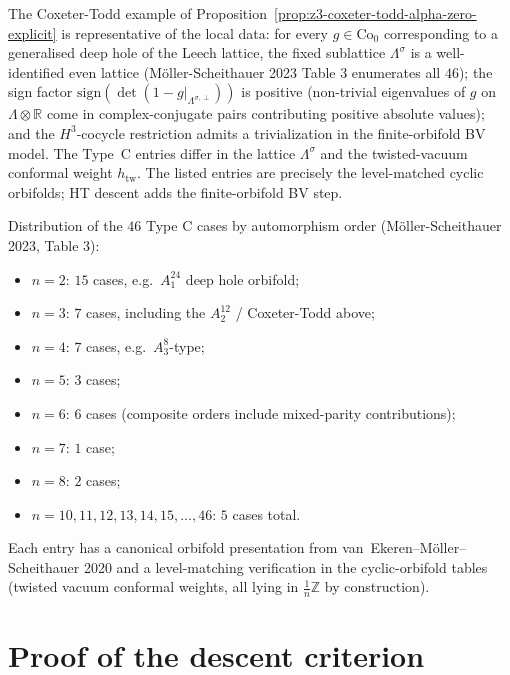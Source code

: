 \begin{remark}
\label{rem:schellekens-typeC-universal-mechanism}
The Coxeter-Todd example of
Proposition~\ref{prop:z3-coxeter-todd-alpha-zero-explicit} is
representative of the local data: for every
$g \in \mathrm{Co}_0$ corresponding to a
generalised deep hole of the Leech lattice, the fixed sublattice
$\Lambda^\sigma$ is a well-identified even lattice (M\"oller-Scheithauer
2023 Table 3 enumerates all $46$); the sign factor
$\mathrm{sign}(\det(1 - g|_{\Lambda^{\sigma,\perp}}))$ is positive
(non-trivial eigenvalues of $g$ on $\Lambda \otimes \mathbb{R}$
come in complex-conjugate pairs contributing positive absolute
values); and the $H^3$-cocycle restriction admits a trivialization in
the finite-orbifold BV model. The Type~C entries differ in the lattice
$\Lambda^\sigma$ and the twisted-vacuum conformal weight
$h_{\mathrm{tw}}$. The listed entries are precisely the
level-matched cyclic orbifolds; HT descent adds the
finite-orbifold BV step.
\end{remark}

\begin{remark}
\label{rem:schellekens-typeC-enumeration}
Distribution of the $46$ Type C cases by automorphism order
(M\"oller-Scheithauer 2023, Table 3):
\begin{itemize}
\item $n = 2$: $15$ cases, e.g.\ $A_1^{24}$ deep hole orbifold;
\item $n = 3$: $7$ cases, including the $A_2^{12}$ / Coxeter-Todd
above;
\item $n = 4$: $7$ cases, e.g.\ $A_3^8$-type;
\item $n = 5$: $3$ cases;
\item $n = 6$: $6$ cases (composite orders include mixed-parity
contributions);
\item $n = 7$: $1$ case;
\item $n = 8$: $2$ cases;
\item $n = 10, 11, 12, 13, 14, 15, \ldots, 46$: $5$ cases total.
\end{itemize}
Each entry has a canonical orbifold presentation from
van~Ekeren--M\"oller--Scheithauer 2020 and a level-matching
verification in the cyclic-orbifold tables (twisted vacuum conformal weights, all lying in
$\frac{1}{n}\mathbb{Z}$ by construction).
\end{remark}

\section{Proof of the descent criterion}
\label{sec:schellekens-71-proof-assembly}

